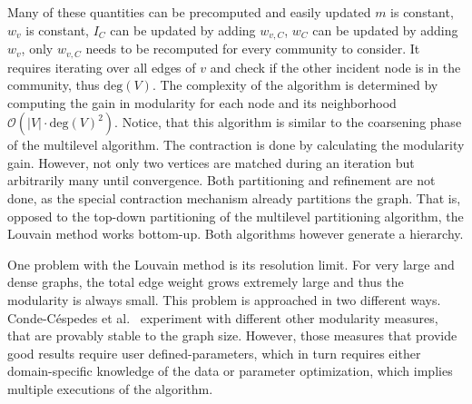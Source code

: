                 Many of these quantities can be precomputed and easily updated
                $m$ is constant, $w_v$ is constant, $I_C$ can be updated by adding $w_{v, C}$, $w_C$ can be updated by adding $w_v$, only $w_{v, C}$ needs to be recomputed for every community to consider. 
                It requires iterating over all edges of $v$ and check if the other incident node is in the community, thus $\text{deg}(V)$.
                The complexity of the algorithm is determined by computing the gain in modularity for each node and its neighborhood
                $\mathcal{O}(|V| \cdot \text{deg}(V)^2)$.
                Notice, that this algorithm is similar to the coarsening phase of the multilevel algorithm.
                The contraction is done by calculating the modularity gain.
                However, not only two vertices are matched during an iteration but arbitrarily many until convergence. 
                Both partitioning and refinement are not done, as the special contraction mechanism already partitions the graph.
                That is, opposed to the top-down partitioning of the multilevel partitioning algorithm, the Louvain method works bottom-up.
                Both algorithms however generate a hierarchy.
                
                One problem with the Louvain method is its resolution limit.
                For very large and dense graphs, the total edge weight grows extremely large and thus the modularity is always small.
                This problem is approached in two different ways.
                Conde-C{\'e}spedes et al.~\autocite{conde2017comparison} experiment with different other modularity measures, that are provably stable to the graph size.
                However, those measures that provide good results require user defined-parameters, which in turn requires either domain-specific knowledge of the data or parameter optimization, which implies multiple executions of the algorithm. 
                


 

